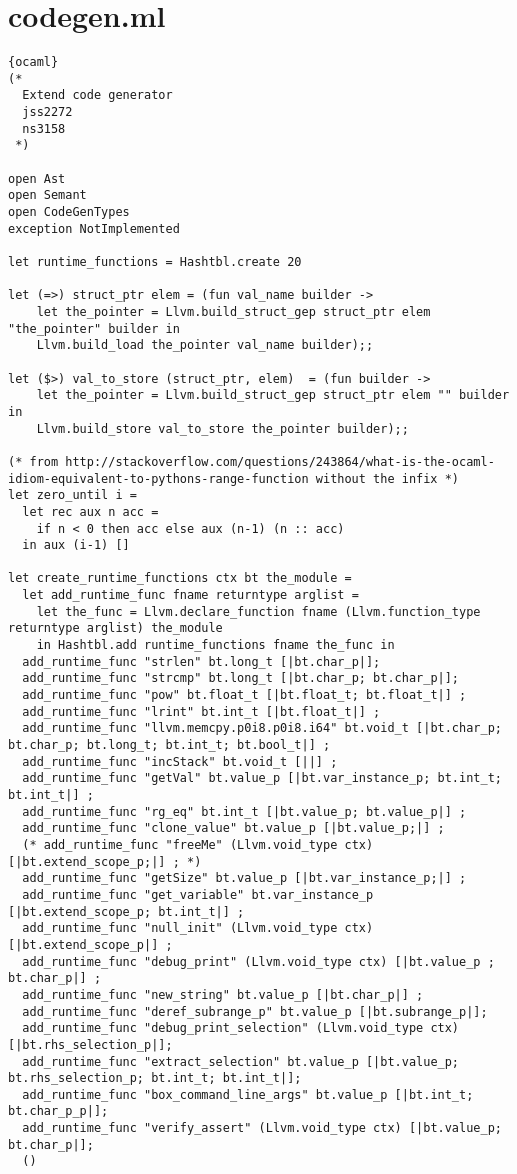 \section{codegen.ml}
\begin{lstlisting}{ocaml}
(*
  Extend code generator
  jss2272
  ns3158
 *)

open Ast
open Semant
open CodeGenTypes
exception NotImplemented

let runtime_functions = Hashtbl.create 20

let (=>) struct_ptr elem = (fun val_name builder ->
    let the_pointer = Llvm.build_struct_gep struct_ptr elem "the_pointer" builder in
    Llvm.build_load the_pointer val_name builder);;

let ($>) val_to_store (struct_ptr, elem)  = (fun builder ->
    let the_pointer = Llvm.build_struct_gep struct_ptr elem "" builder in
    Llvm.build_store val_to_store the_pointer builder);;

(* from http://stackoverflow.com/questions/243864/what-is-the-ocaml-idiom-equivalent-to-pythons-range-function without the infix *)
let zero_until i =
  let rec aux n acc =
    if n < 0 then acc else aux (n-1) (n :: acc)
  in aux (i-1) []

let create_runtime_functions ctx bt the_module =
  let add_runtime_func fname returntype arglist =
    let the_func = Llvm.declare_function fname (Llvm.function_type returntype arglist) the_module
    in Hashtbl.add runtime_functions fname the_func in
  add_runtime_func "strlen" bt.long_t [|bt.char_p|];
  add_runtime_func "strcmp" bt.long_t [|bt.char_p; bt.char_p|];
  add_runtime_func "pow" bt.float_t [|bt.float_t; bt.float_t|] ;
  add_runtime_func "lrint" bt.int_t [|bt.float_t|] ;
  add_runtime_func "llvm.memcpy.p0i8.p0i8.i64" bt.void_t [|bt.char_p; bt.char_p; bt.long_t; bt.int_t; bt.bool_t|] ;
  add_runtime_func "incStack" bt.void_t [||] ;
  add_runtime_func "getVal" bt.value_p [|bt.var_instance_p; bt.int_t; bt.int_t|] ;
  add_runtime_func "rg_eq" bt.int_t [|bt.value_p; bt.value_p|] ;
  add_runtime_func "clone_value" bt.value_p [|bt.value_p;|] ;
  (* add_runtime_func "freeMe" (Llvm.void_type ctx) [|bt.extend_scope_p;|] ; *)
  add_runtime_func "getSize" bt.value_p [|bt.var_instance_p;|] ;
  add_runtime_func "get_variable" bt.var_instance_p [|bt.extend_scope_p; bt.int_t|] ;
  add_runtime_func "null_init" (Llvm.void_type ctx) [|bt.extend_scope_p|] ;
  add_runtime_func "debug_print" (Llvm.void_type ctx) [|bt.value_p ; bt.char_p|] ;
  add_runtime_func "new_string" bt.value_p [|bt.char_p|] ;
  add_runtime_func "deref_subrange_p" bt.value_p [|bt.subrange_p|];
  add_runtime_func "debug_print_selection" (Llvm.void_type ctx) [|bt.rhs_selection_p|];
  add_runtime_func "extract_selection" bt.value_p [|bt.value_p; bt.rhs_selection_p; bt.int_t; bt.int_t|];
  add_runtime_func "box_command_line_args" bt.value_p [|bt.int_t; bt.char_p_p|];
  add_runtime_func "verify_assert" (Llvm.void_type ctx) [|bt.value_p; bt.char_p|];
  ()


\end{lstlisting}
